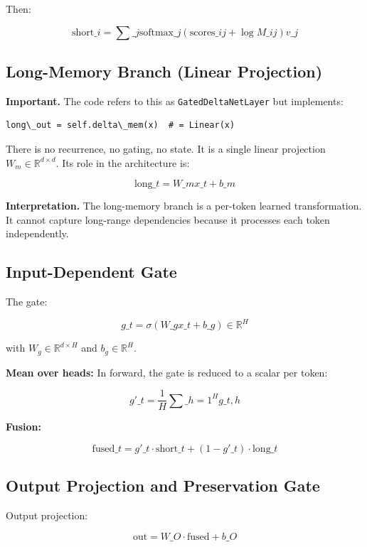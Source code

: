 Then:

\[
\text{short}\_i = \sum\_j \text{softmax}\_j(\text{scores}\_{ij} + \log M\_{ij}) v\_j
\tag{4.4}
\]

\subsection{Long-Memory Branch (Linear Projection)}

\textbf{Important.} The code refers to this as \texttt{GatedDeltaNetLayer} but 
implements:

\begin{lstlisting}
long\_out = self.delta\_mem(x)  # = Linear(x)
\end{lstlisting}

There is no recurrence, no gating, no state. It is a single linear 
projection $W_m \in \mathbb{R}^{d \times d}$. Its role in the architecture 
is:

\[
\text{long}\_t = W\_m x\_t + b\_m
\tag{4.5}
\]

\textbf{Interpretation.} The long-memory branch is a per-token learned 
transformation. It cannot capture long-range dependencies because it 
processes each token independently.

\subsection{Input-Dependent Gate}

The gate:

\[
g\_t = \sigma(W\_g x\_t + b\_g) \in \mathbb{R}^H
\tag{4.6}
\]

with $W_g \in \mathbb{R}^{d \times H}$ and $b_g \in \mathbb{R}^H$.

\textbf{Mean over heads:} In forward, the gate is reduced to a scalar per token:

\[
g'\_t = \frac{1}{H} \sum\_{h=1}^H g\_{t,h}
\tag{4.7}
\]

\textbf{Fusion:}

\[
\text{fused}\_t = g'\_t \cdot \text{short}\_t + (1 - g'\_t) \cdot \text{long}\_t
\tag{4.8}
\]

\subsection{Output Projection and Preservation Gate}

Output projection:

\[
\text{out} = W\_O \cdot \text{fused} + b\_O
\tag{4.9}
\]


